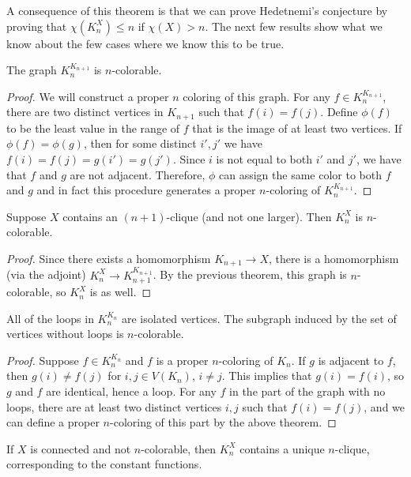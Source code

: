 A consequence of this theorem is that we can prove Hedetnemi's conjecture by proving that $\chi(K_n^X)\leq n$ if $\chi(X)>n$.  The next few results show what we know about the few cases where we know this to be true.

\begin{theorem}
	The graph $K_n^{K_{n+1}}$ is $n$-colorable.
\end{theorem}
\begin{proof}
	We will construct a proper $n$ coloring of this graph.  For any $f\in K_n^{K_{n+1}}$, there are two distinct vertices in $K_{n+1}$ such that $f(i)=f(j)$.  Define $\phi(f)$ to be the least value in the range of $f$ that is the image of at least two vertices.  If $\phi(f)=\phi(g)$, then for some distinct $i',j'$ we have $f(i)=f(j)=g(i')=g(j')$.  Since $i$ is not equal to both $i'$ and $j'$, we have that $f$ and $g$ are not adjacent.  Therefore, $\phi$ can assign the same color to both $f$ and $g$ and in fact this procedure generates a proper $n$-coloring of $K_n^{K_{n+1}}$.
\end{proof}

\begin{corollary}
	Suppose $X$ contains an $(n+1)$-clique (and not one larger).  Then $K_n^X$ is $n$-colorable.
\end{corollary}
\begin{proof}
	Since there exists a homomorphism $K_{n+1}\rightarrow X$, there is a homomorphism (via the adjoint) $K_n^X\rightarrow K_{n+1}^{K_{n+1}}$.  By the previous theorem, this graph is $n$-colorable, so $K_n^X$ is as well.
\end{proof}

\begin{theorem}
	All of the loops in $K_n^{K_{n}}$ are isolated vertices.  The subgraph induced by the set of vertices without loops is $n$-colorable.
\end{theorem}
\begin{proof}
	Suppose $f\in K_n^{K_n}$ and $f$ is a proper $n$-coloring of $K_n$.  If $g$ is adjacent to $f$, then $g(i)\neq f(j)$ for $i,j\in V(K_n)$, $i\neq j$.  This implies that $g(i)=f(i)$, so $g$ and $f$ are identical, hence a loop.
	For any $f$ in the part of the graph with no loops, there are at least two distinct vertices $i,j$ such that $f(i)=f(j)$, and we can define a proper $n$-coloring of this part by the above theorem.
\end{proof}

\begin{theorem}
	If $X$ is connected and not $n$-colorable, then $K_n^X$ contains a unique $n$-clique, corresponding to the constant functions.
\end{theorem}

